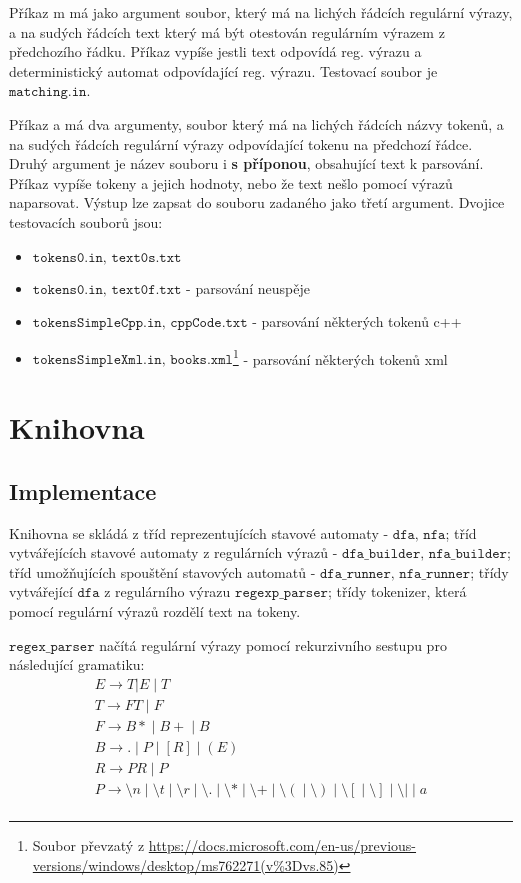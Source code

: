 \documentclass{article}
\newcommand{\delim}{\; \big| \;}
\begin{document}
Příkaz m má jako argument soubor, který má na lichých řádcích regulární výrazy, a na sudých řádcích text který má být otestován regulárním výrazem z předchozího řádku. Příkaz vypíše jestli text odpovídá reg. výrazu a deterministický automat odpovídající reg. výrazu. Testovací soubor je $\texttt{matching.in}$.

Příkaz a má dva argumenty, soubor který má na lichých řádcích názvy tokenů, a na sudých řádcích regulární výrazy odpovídající tokenu na předchozí řádce. Druhý argument je název souboru i \textbf{s příponou}, obsahující text k parsování. Příkaz vypíše tokeny a jejich hodnoty, nebo že text nešlo pomocí výrazů naparsovat. Výstup lze zapsat do souboru zadaného jako třetí argument. Dvojice testovacích souborů jsou:


\begin{itemize}
	\item $\texttt{tokens0.in, text0s.txt }$
	\item $\texttt{tokens0.in, text0f.txt}$ - parsování neuspěje
	\item $\texttt{tokensSimpleCpp.in, cppCode.txt}$ - parsování některých tokenů c++
	\item $\texttt{tokensSimpleXml.in, books.xml}$\footnote{Soubor převzatý z \url{https://docs.microsoft.com/en-us/previous-versions/windows/desktop/ms762271(v\%3Dvs.85)}} - parsování některých tokenů xml
\end{itemize}

\section{Knihovna}
\subsection*{Implementace}
Knihovna se skládá z tříd reprezentujících stavové automaty - $\texttt{dfa, nfa}$; tříd vytvářejících stavové automaty z regulárních výrazů - $\texttt{dfa\_builder, nfa\_builder}$; tříd umožňujících spouštění stavových automatů - $\texttt{dfa\_runner, nfa\_runner}$; třídy vytvářející $\texttt{dfa}$ z regulárního výrazu $\texttt{regexp\_parser}$; třídy tokenizer, která pomocí regulární výrazů rozdělí text na tokeny.

$\texttt{regex\_parser}$ načítá regulární výrazy pomocí rekurzivního sestupu pro následující gramatiku:
\begin{gather*}
E \rightarrow T|E \delim T \\
T \rightarrow FT \delim F \\
F \rightarrow B* \delim B+ \delim B \\
B \rightarrow . \delim P \delim [R] \delim (E) \\
R \rightarrow PR \delim P \\
P \rightarrow \setminus n \delim \setminus t  \delim \setminus r  \delim \setminus .  \delim \setminus *  \delim \setminus +  \delim \setminus (  \delim \setminus )  \delim \setminus [  \delim \setminus ]  \delim \setminus |  \delim a  \\
\end{gather*}
\end{document}
